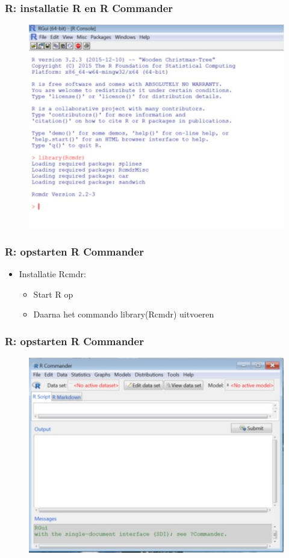 \documentclass{beamer}
\begin{document}
\begin{frame}
  \frametitle{R: installatie R en R Commander}
  \begin{figure}[h]
    \centering
    \includegraphics[width= \textwidth]{img/oef3/installatie-Rcmdr}
  \end{figure}
\end{frame}

\begin{frame}
  \frametitle{R: opstarten R Commander}
  \begin{itemize}
    \item Installatie Rcmdr:
      \begin{itemize}
        \item Start R op
        \item Daarna het commando library(Rcmdr) uitvoeren
      \end{itemize}
  \end{itemize}
\end{frame}

\begin{frame}
  \frametitle{R: opstarten R Commander}
  \begin{figure}[h]
    \centering
    \includegraphics[width= \textwidth]{img/oef3/startscherm-R-Commander}
  \end{figure}
\end{frame}
\end{document}
